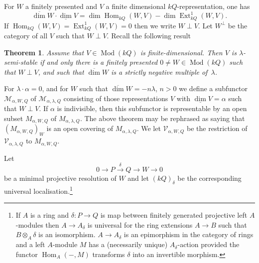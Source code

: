 \documentclass{amsart}
\numberwithin{equation}{section}
\let\cal\mathcal
\newtheorem{theorems}[lemmas]{Theorem}
\theoremstyle{definition}
\theoremstyle{remark}
\begin{document}
For $W$ a finitely presented and $V$ a finite dimensional $kQ$-representation, one has
\[
 {\operatorname{\overline{\dim}}} W\cdot {\operatorname{\underline{\dim}}} V =\dim {\operatorname {Hom}}_{kQ}(W,V)-\dim {\operatorname {Ext}}_{kQ}^1(W,V).
\]
If ${\operatorname {Hom}}_{kQ}(W,V)={\operatorname {Ext}}^1_{kQ}(W,V)=0$ then we write $W\perp V$.  Let $W^\perp$ be the category of all $V$ such that $W\perp V$. 
Recall the following result
\begin{theorems} \cite{WeymanDerksen,DomokosZubkov}\cite[Cor 1.1]{SchVdB3} \label{ref-2.5.4-14}
Assume that $V\in {\operatorname{Mod}}(kQ)$ is finite-dimensional. Then $V$ is $\lambda$-semi-stable
if and only there is a finitely presented   $0\neq W\in {\operatorname{Mod}}(kQ)$ such that 
$W\perp V$, and such that ${\operatorname{\overline{\dim}}} W$ is a strictly negative multiple of~$\lambda$.  
\end{theorems}
For $\lambda\cdot \alpha=0$, and for $W$ such that ${\operatorname{\overline{\dim}}} W=-n\lambda$, $n>0$ 
we define a subfunctor ${{\cal M}}_{\alpha,W,Q}$
of ${{\cal M}}_{\alpha,\lambda,Q}$ consisting of those representations $V$ with ${\operatorname{\underline{\dim}}}
V=\alpha$ such that $W\perp V$. 
If $\alpha$ is indivisible, then this subfunctor is representable  by an open subset $M_{\alpha,W,Q}$
of $M_{\alpha,\lambda,Q}$. 
The above theorem may be rephrased as
saying that $(M_{\alpha,W,Q})_W$ is an open covering of $M_{\alpha,\lambda,Q}$. We let ${{\cal V}}_{\alpha,W,Q}$ be the restriction of
${{\cal V}}_{\alpha,\lambda,Q}$ to $M_{\alpha,W,Q}$.

Let 
\[
0{\rightarrow} P\xrightarrow{\delta} Q{\rightarrow} W{\rightarrow} 0
\]
be a minimal projective resolution of $W$ and let $(kQ)_\delta$ 
be the corresponding universal localisation.\footnote{If $A$ is a ring and $\delta:P{\rightarrow} Q$ is
map between finitely generated projective left $A$-modules then $A{\rightarrow} A_\delta$ is 
universal for the ring extensions $A{\rightarrow} B$ such that $B\otimes_A\delta$
is an isomorphism. $A{\rightarrow} A_\delta$ is an epimorphism in the category of
rings and a left $A$-module $M$ has a (necessarily unique) $A_\delta$-action
provided the functor ${\operatorname {Hom}}_A(-,M)$ transforms $\delta$ into an invertible morphism.}
\end{document}
